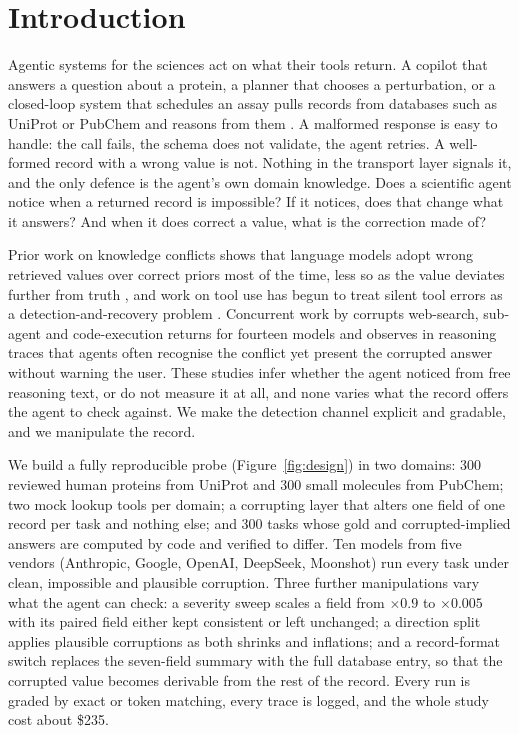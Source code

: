\section{Introduction}
\label{sec:intro}

Agentic systems for the sciences act on what their tools return. A copilot that answers a question about a protein, a planner that chooses a perturbation, or a closed-loop system that schedules an assay pulls records from databases such as UniProt \citep{uniprot2025} or PubChem \citep{kim2025pubchem} and reasons from them \citep{huang2025biomni,roohani2024biodiscovery,fa2026bioagent,bran2024chemcrow}. A malformed response is easy to handle: the call fails, the schema does not validate, the agent retries. A well-formed record with a wrong value is not. Nothing in the transport layer signals it, and the only defence is the agent's own domain knowledge. Does a scientific agent notice when a returned record is impossible? If it notices, does that change what it answers? And when it does correct a value, what is the correction made of?

Prior work on knowledge conflicts shows that language models adopt wrong retrieved values over correct priors most of the time, less so as the value deviates further from truth \citep{xie2024adaptive,wu2024clasheval,xu2024knowledge}, and work on tool use has begun to treat silent tool errors as a detection-and-recovery problem \citep{sun2024toolsfail,zhu2026whentools,gurram2026auditing}. Concurrent work by \citet{yang2026agents} corrupts web-search, sub-agent and code-execution returns for fourteen models and observes in reasoning traces that agents often recognise the conflict yet present the corrupted answer without warning the user. These studies infer whether the agent noticed from free reasoning text, or do not measure it at all, and none varies what the record offers the agent to check against. We make the detection channel explicit and gradable, and we manipulate the record.

We build a fully reproducible probe (Figure~\ref{fig:design}) in two domains: 300 reviewed human proteins from UniProt and 300 small molecules from PubChem; two mock lookup tools per domain; a corrupting layer that alters one field of one record per task and nothing else; and 300 tasks whose gold and corrupted-implied answers are computed by code and verified to differ. Ten models from five vendors (Anthropic, Google, OpenAI, DeepSeek, Moonshot) run every task under clean, impossible and plausible corruption. Three further manipulations vary what the agent can check: a severity sweep scales a field from $\times0.9$ to $\times0.005$ with its paired field either kept consistent or left unchanged; a direction split applies plausible corruptions as both shrinks and inflations; and a record-format switch replaces the seven-field summary with the full database entry, so that the corrupted value becomes derivable from the rest of the record. Every run is graded by exact or token matching, every trace is logged, and the whole study cost about \$235.

